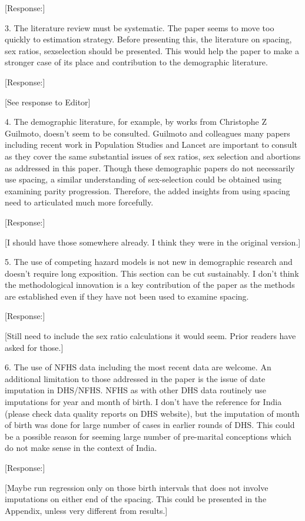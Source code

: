 \documentclass[letterpaper,12pt]{article}
\begin{document}
[Response:]

3. The literature review must be systematic. The paper seems to move too
quickly to estimation strategy. Before presenting this, the literature
on spacing, sex ratios, sexselection should be presented. This would
help the paper to make a stronger case of its place and contribution to
the demographic literature.

[Response:]

[See response to Editor]


4. The demographic literature, for example, by works from Christophe Z
Guilmoto, doesn’t seem to be consulted. Guilmoto and colleagues many
papers including recent work in Population Studies and Lancet are
important to consult as they cover the same substantial issues of sex
ratios, sex selection and abortions as addressed in this paper. Though
these demographic papers do not necessarily use spacing, a similar
understanding of sex-selection could be obtained using examining parity
progression. Therefore, the added insights from using spacing need to
articulated much more forcefully.

[Response:]

[I should have those somewhere already. I think they were in the original version.]

5. The use of competing hazard models is not new in demographic research
and doesn’t require long exposition. This section can be cut
sustainably. I don’t think the methodological innovation is a key
contribution of the paper as the methods are established even if they
have not been used to examine spacing.

[Response:]

[Still need to include the sex ratio calculations it would seem.
Prior readers have asked for those.]


6. The use of NFHS data including the most recent data are welcome. An
additional limitation to those addressed in the paper is the issue of
date imputation in DHS/NFHS. NFHS as with other DHS data routinely use
imputations for year and month of birth. I don’t have the reference for
India (please check data quality reports on DHS website), but the
imputation of month of birth was done for large number of cases in
earlier rounds of DHS. This could be a possible reason for seeming large
number of pre-marital conceptions which do not make sense in the context
of India.

[Response:]

[Maybe run regression only on those birth intervals that does not
involve imputations on either end of the spacing.
This could be presented in the Appendix, unless very different from
results.]
\end{document}
